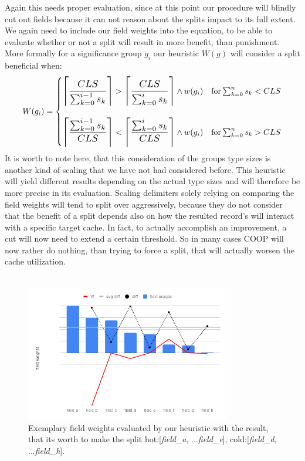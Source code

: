 Again this needs proper evaluation, since at this point our procedure will blindly cut out fields because it can not reason about the splits impact to its full extent. We again need to include our field weights into the equation, to be able to evaluate whether or not a split will result in more benefit, than punishment.
More formally for a significance group $g_i$ our heuristic $W(g)$ will consider a split beneficial when:
\begin{equation*}
W(g_i) =
\begin{cases}
\scalemath{1.2}{\myceil{\frac{CLS}{\sum_{k=0}^{i-1}s_k}}} > \scalemath{1.2}{\myceil{\frac{CLS}{\sum_{k=0}^{i}s_k}}} \land w(g_i) & \text{for}\sum_{k=0}^{n}s_k < CLS\\\\
\scalemath{1.2}{\myceil{\frac{\sum_{k=0}^{i-1}s_k}{CLS}}} < \scalemath{1.2}{\myceil{\frac{\sum_{k=0}^{i}s_k}{CLS}}} \land w(g_i) & \text{for}\sum_{k=0}^{n}s_k > CLS
\end{cases}
\end{equation*}
It is worth to note here, that this consideration of the groups type sizes is another kind of scaling that we have not had considered before. This heuristic will yield different results depending on the actual type sizes and will therefore be more precise in its evaluation. Scaling delimiters solely relying on comparing the field weights will tend to split over aggressively, because they do not consider that the benefit of a split depends also on how the resulted record's will interact with a specific target cache. In fact, to actually accomplish an improvement, a cut will now need to extend a certain threshold. So in many cases COOP will now rather do nothing, than trying to force a split, that will actually worsen the cache utilization.\\\\
\begin{figure}[tbp]
	\centering
	\includegraphics[width=0.8\textwidth,height=0.5\textwidth]{PICs/sig_order_final}
	\caption{Exemplary field weights evaluated by our heuristic with the result, that its worth to make the split hot:[\textit{field\_a}, ...\textit{field\_e}], cold:[\textit{field\_d}, ...\textit{field\_h}].}
	\label{sig_order_final}
\end{figure}
